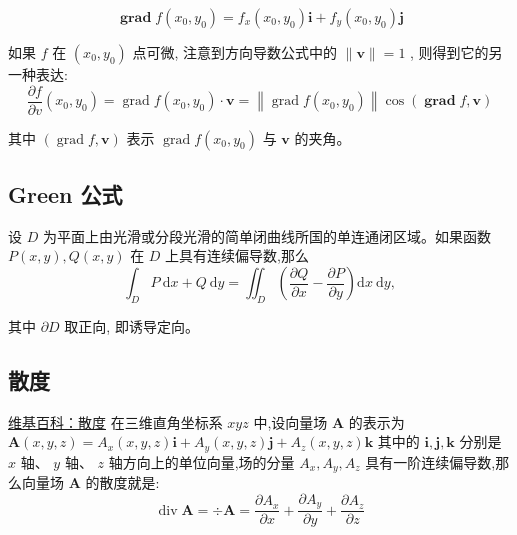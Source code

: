 \documentclass{book}
\begin{document}
\begin{equation}
    \boldsymbol{\operatorname { g r a d }} f\left(x_{0}, y_{0}\right)=f_{x}\left(x_{0}, y_{0}\right) \boldsymbol{i}+f_{y}\left(x_{0}, y_{0}\right) \boldsymbol{j}
\end{equation}

如果  $f$  在  $\left(x_{0}, y_{0}\right)$ 点可微, 注意到方向导数公式中的  $\|\boldsymbol{v}\|=1$ , 则得到它的另一种表达:
\begin{equation}
    \frac{\partial f}{\partial v}\left(x_{0}, y_{0}\right)=\operatorname{grad} f\left(x_{0}, y_{0}\right) \cdot \boldsymbol{v}=\left\|\operatorname{grad} f\left(x_{0}, y_{0}\right)\right\| \cos (\boldsymbol{\operatorname { g r a d }} f, \boldsymbol{v})
\end{equation}

其中  $(\operatorname{grad} f, \boldsymbol{v})$  表示  $\operatorname{grad} f\left(x_{0}, y_{0}\right)$  与  $\boldsymbol{v}$  的夹角。

\subsection{Green 公式}
设  $D$  为平面上由光滑或分段光滑的简单闭曲线所国的单连通闭区域。如果函数  $P(x, y), Q(x, y)$  在  $D$  上具有连续偏导数,那么
\begin{equation}
    \int_{D} P \mathrm{~d} x+Q \mathrm{~d} y=\iint_{D}\left(\frac{\partial Q}{\partial x}-\frac{\partial P}{\partial y}\right) \mathrm{d} x \mathrm{~d} y,
\end{equation}

其中 $\partial D$  取正向, 即诱导定向。

\subsection{散度}
\href{https://zh.wikipedia.org/zh-hans/%E6%95%A3%E5%BA%A6}{维基百科：散度} 
在三维直角坐标系  $x y z$  中,设向量场  $\boldsymbol{A}$  的表示为
$\boldsymbol{A}(x, y, z)=A_{x}(x, y, z) \boldsymbol{i}+A_{y}(x, y, z) \boldsymbol{j}+A_{z}(x, y, z) \boldsymbol{k}$ 其中的  $\boldsymbol{i}, \boldsymbol{j}, \boldsymbol{k} $ 分别是  $x$  轴、  $y$  轴、  $z$  轴方向上的单位向量,场的分量  $A_{x}, A_{y}, A_{z}$  具有一阶连续偏导数,那么向量场  $\boldsymbol{A}$  的散度就是:
\begin{equation}
    \operatorname{div} \boldsymbol{A}=\div \boldsymbol{A}=\dfrac{\partial A_{x}}{\partial x}+\dfrac{\partial A_{y}}{\partial y}+\dfrac{\partial A_{z}}{\partial z}
\end{equation}
\end{document}
